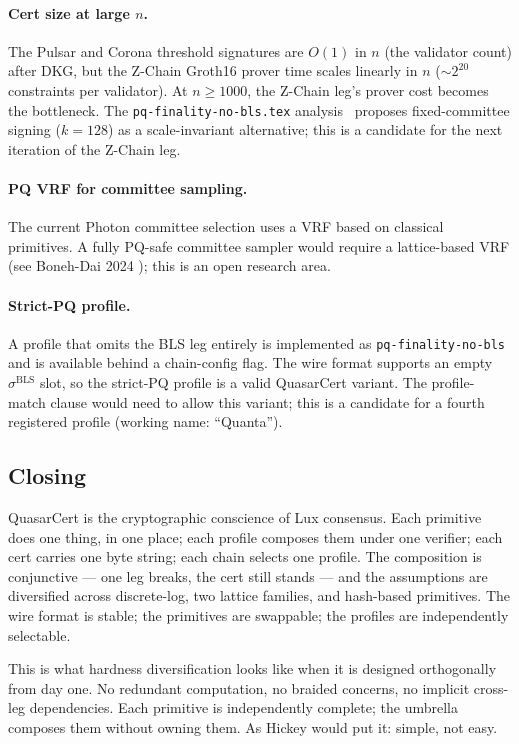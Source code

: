 \paragraph{Cert size at large $n$.} The Pulsar and Corona threshold
signatures are $O(1)$ in $n$ (the validator count) after DKG, but
the Z-Chain Groth16 prover time scales linearly in $n$
($\sim 2^{20}$ constraints per validator). At $n \geq 1000$, the
Z-Chain leg's prover cost becomes the bottleneck. The
\texttt{pq-finality-no-bls.tex} analysis~\cite{pqfinalitynobls}
proposes fixed-committee signing ($k = 128$) as a scale-invariant
alternative; this is a candidate for the next iteration of the
Z-Chain leg.

\paragraph{PQ VRF for committee sampling.} The current Photon
committee selection uses a VRF based on classical primitives. A
fully PQ-safe committee sampler would require a lattice-based VRF
(see Boneh-Dai 2024 \cite{bonehdai2024}); this is an open research
area.

\paragraph{Strict-PQ profile.} A profile that omits the BLS leg
entirely is implemented as \texttt{pq-finality-no-bls}
\cite{pqfinalitynobls} and is available behind a chain-config
flag. The wire format supports an empty $\sigma^{\mathrm{BLS}}$
slot, so the strict-PQ profile is a valid QuasarCert variant. The
profile-match clause would need to allow this variant; this is a
candidate for a fourth registered profile (working name: ``Quanta'').

\subsection{Closing}

QuasarCert is the cryptographic conscience of Lux consensus. Each
primitive does one thing, in one place; each profile composes them
under one verifier; each cert carries one byte string; each chain
selects one profile. The composition is conjunctive --- one leg
breaks, the cert still stands --- and the assumptions are
diversified across discrete-log, two lattice families, and
hash-based primitives. The wire format is stable; the primitives
are swappable; the profiles are independently selectable.

This is what hardness diversification looks like when it is
designed orthogonally from day one. No redundant computation, no
braided concerns, no implicit cross-leg dependencies. Each
primitive is independently complete; the umbrella composes them
without owning them. As Hickey would put it: simple, not easy.

